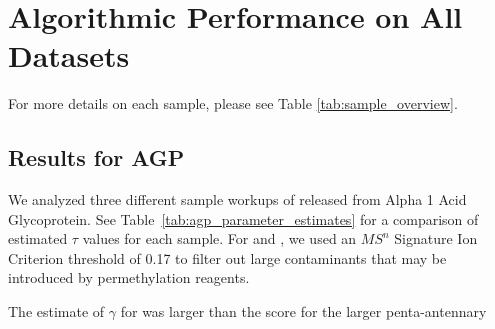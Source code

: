 
\section{Algorithmic Performance on All Datasets}\label{sec:algorithm_performance}
    For more details on each sample, please see Table \ref{tab:sample_overview}.

\subsection{Results for AGP}
    
    We analyzed three different sample workups of \nglycans released from Alpha 1 Acid
    Glycoprotein. See Table~\ref{tab:agp_parameter_estimates} for a comparison of estimated $\tau$
    values for each sample. For \dpagp and \rpagp, we used an $MS^n$ Signature Ion Criterion
    threshold of 0.17 to filter out large contaminants that may be introduced by permethylation
    reagents.

    The estimate of $\gamma$ for \agp was larger than the score for the larger penta-antennary 

